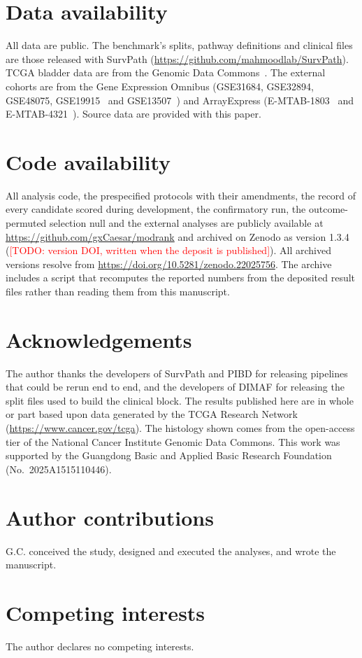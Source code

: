 \documentclass[pdflatex,sn-nature]{sn-jnl}
\newcommand{\TODO}[1]{\textcolor{red}{[TODO: #1]}}
\begin{document}
\section*{Data availability}

All data are public. The benchmark's splits, pathway definitions and clinical files are those
released with SurvPath (\url{https://github.com/mahmoodlab/SurvPath}). TCGA bladder data are from
the Genomic Data Commons~\citep{heath2021gdc}. The external cohorts are from the Gene Expression
Omnibus (GSE31684, GSE32894, GSE48075, GSE19915~\citep{lindgren2010combined} and
GSE13507~\citep{kim2010progression, lee2010e2f1}) and ArrayExpress
(E-MTAB-1803~\citep{rebouissou2014egfr} and E-MTAB-4321~\citep{hedegaard2016uromol}). Source data are provided with this paper.

\section*{Code availability}

All analysis code, the prespecified protocols with their amendments, the record of every candidate
scored during development, the confirmatory run, the outcome-permuted selection null and the external
analyses are publicly available at \url{https://github.com/gxCaesar/modrank} and archived on Zenodo as
version 1.3.4 (\TODO{version DOI, written when the deposit is published}). All archived versions
resolve from \url{https://doi.org/10.5281/zenodo.22025756}. The archive includes a script that recomputes the
reported numbers from the deposited result files rather than reading them from this manuscript.



\section*{Acknowledgements}

The author thanks the developers of SurvPath and PIBD for releasing pipelines that could be rerun end
to end, and the developers of DIMAF for releasing the split files used to build the clinical block.
The results published here are in whole or part based upon data generated by the TCGA Research
Network (\url{https://www.cancer.gov/tcga}). The histology shown comes from the open-access tier of
the National Cancer Institute Genomic Data Commons. This work was supported by the Guangdong Basic and
Applied Basic Research Foundation (No.~2025A1515110446).

\section*{Author contributions}

G.C. conceived the study, designed and executed the analyses, and wrote the manuscript.

\section*{Competing interests}

The author declares no competing interests.
\end{document}

